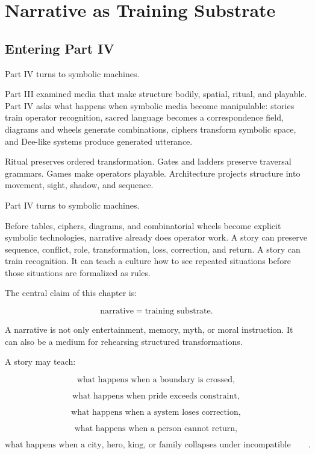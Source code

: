\documentclass[11pt]{book}
\begin{document}
\chapter{Narrative as Training Substrate}

\section{Entering Part IV}

Part IV turns to symbolic machines.

Part III examined media that make structure bodily, spatial, ritual, and playable. Part IV asks what happens when symbolic media become manipulable: stories train operator recognition, sacred language becomes a correspondence field, diagrams and wheels generate combinations, ciphers transform symbolic space, and Dee-like systems produce generated utterance.

Ritual preserves ordered transformation. Gates and ladders preserve traversal grammars. Games make operators playable. Architecture projects structure into movement, sight, shadow, and sequence.

Part IV turns to symbolic machines.

Before tables, ciphers, diagrams, and combinatorial wheels become explicit symbolic technologies, narrative already does operator work. A story can preserve sequence, conflict, role, transformation, loss, correction, and return. A story can train recognition. It can teach a culture how to see repeated situations before those situations are formalized as rules.

The central claim of this chapter is:

\[
\text{narrative} = \text{training substrate}.
\]

A narrative is not only entertainment, memory, myth, or moral instruction. It can also be a medium for rehearsing structured transformations.

A story may teach:

\[
\text{what happens when a boundary is crossed},
\]

\[
\text{what happens when pride exceeds constraint},
\]

\[
\text{what happens when a system loses correction},
\]

\[
\text{what happens when a person cannot return},
\]

\[
\text{what happens when a city, hero, king, or family collapses under incompatible obligations}.
\]
\end{document}
